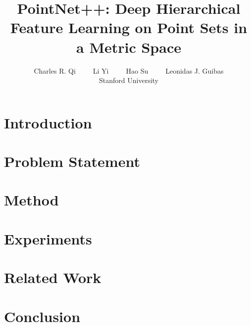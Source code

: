 \documentclass{article}
\title{PointNet++: Deep Hierarchical Feature Learning on Point Sets in a Metric Space}
\author{
  Charles R. Qi~~~~~Li Yi~~~~~Hao Su~~~~~Leonidas J. Guibas \\
  Stanford University
}
\begin{document}

\maketitle

\begin{abstract}
  
\end{abstract}

\section{Introduction}



\section{Problem Statement}


\section{Method}


\section{Experiments}


\vspace{-0.1cm}
\section{Related Work}


\vspace{-0.1cm}
\section{Conclusion}

\vspace{-0.1cm}
% 
{\small


}
\newpage

\end{document}
